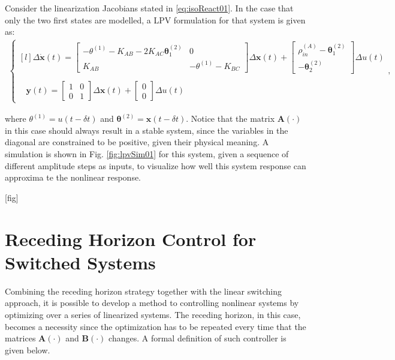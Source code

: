 \documentclass[a4paper,11pt]{book}
\numberwithin{figure}{chapter}
\numberwithin{equation}{chapter}
\numberwithin{table}{chapter}
\theoremstyle{definition}
\begin{document}
Consider the linearization Jacobians stated in \eqref{eq:isoReact01}. In the case that only the two first states are modelled, a LPV formulation for that system is given as:
\begin{align}   \label{eq:isoReactLPV}
\left\{ \begin{matrix*}[l]
    \Delta \dot{\bm{x}}(t) = \begin{bmatrix}
        -\theta^{(1)} - K_{AB} - 2K_{AC} \bm{\theta}^{(2)}_1 & 0 \\ K_{AB} & - \theta^{(1)} - K_{BC} 
    \end{bmatrix} \Delta \bm{x}(t) +  \begin{bmatrix}
        \rho_{in}^{(A)} - \bm{\theta}^{(2)}_1 \\ - \bm{\theta}^{(2)}_2
    \end{bmatrix} \Delta u(t) \\ \\
    \phantom{\Delta} \bm{y}(t) = \begin{bmatrix}
        1 & 0  \\ 0 & 1 
    \end{bmatrix} \Delta \bm{x}(t) + \begin{bmatrix}
        0 \\ 0 
    \end{bmatrix} \Delta u(t)
\end{matrix*} \right.
,\end{align}

\noindent where $\theta^{(1)} = u(t-\delta t)$ and $\bm{\theta}^{(2)} = \bm{x}(t-\delta t)$. Notice that the matrix $\bm{A}(\cdot)$ in this case should always result in a stable system, since the variables in the diagonal are constrained to be positive, given their physical meaning. A simulation is shown in Fig. \ref{fig:lpvSim01} for this system, given a sequence of different amplitude steps as inputs, to visualize how well this system response can approxima	te the nonlinear response.

[fig]

\section{Receding Horizon Control for Switched Systems}

Combining the receding horizon strategy together with the linear switching approach, it is possible to develop a method to controlling nonlinear systems by optimizing over a series of linearized systems. The receding horizon, in this case, becomes a necessity since the optimization has to be repeated every time that the matrices $\bm{A}(\cdot)$ and $\bm{B}(\cdot)$ changes. A formal definition of such controller is given below.
\end{document}
